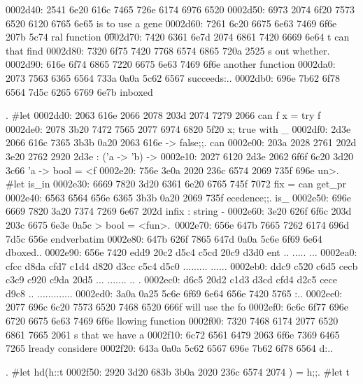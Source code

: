 \begin{bo
00010e0: 7865 647d 5c62 6567 696e 7b76 6572 6261  xed}
\begin{verba
00010f0: 7469 6d7d 0a20 2023 7479 7065 2074 6572  tim}
\begin{
0001c40: 7665 7262 6174 696d 7d0a 2020 236c 6574  verbatim}
\begin{boxe
00027a0: 647d 5c62 6567 696e 7b76 6572 6261 7469  d}
\begin{verbati
00027b0: 6d7d 0a20 2023 6c65 7420 696e 6669 7865  m}
\begin{v
0002c60: 6572 6261 7469 6d7d 0a20 2023 6c65 7420  erbatim}
0002d40: 2541 6e20 616c 7465 726e 6174 6976 6520  %
0002d50: 6973 2074 6f20 7573 6520 6120 6765 6e65  is to use a gene
0002d60: 7261 6c20 6675 6e63 7469 6f6e 207b 5c74  ral function {\t
0002d70: 7420 6361 6e7d 2074 6861 7420 6669 6e64  t can} that find
0002d80: 7320 6f75 7420 7768 6574 6865 720a 2525  s out whether.%
0002d90: 616e 6f74 6865 7220 6675 6e63 7469 6f6e  another function
0002da0: 2073 7563 6365 6564 733a 0a0a 5c62 6567   succeeds:..\beg
0002db0: 696e 7b62 6f78 6564 7d5c 6265 6769 6e7b  in{boxed}\begin{
0002dc0: 7665 7262 6174 696d 7d0a 2020 236c 6574  verbatim}.  #let
0002dd0: 2063 616e 2066 2078 203d 2074 7279 2066   can f x = try f
0002de0: 2078 3b20 7472 7565 2077 6974 6820 5f20   x; true with _ 
0002df0: 2d3e 2066 616c 7365 3b3b 0a20 2063 616e  -> false;;.  can
0002e00: 203a 2028 2761 202d 3e20 2762 2920 2d3e   : ('a -> 'b) ->
0002e10: 2027 6120 2d3e 2062 6f6f 6c20 3d20 3c66   'a -> bool = <f
0002e20: 756e 3e0a 2020 236c 6574 2069 735f 696e  un>.  #let is_in
0002e30: 6669 7820 3d20 6361 6e20 6765 745f 7072  fix = can get_pr
0002e40: 6563 6564 656e 6365 3b3b 0a20 2069 735f  ecedence;;.  is_
0002e50: 696e 6669 7820 3a20 7374 7269 6e67 202d  infix : string -
0002e60: 3e20 626f 6f6c 203d 203c 6675 6e3e 0a5c  > bool = <fun>.\
0002e70: 656e 647b 7665 7262 6174 696d 7d5c 656e  end{verbatim}\en
0002e80: 647b 626f 7865 647d 0a0a 5c6e 6f69 6e64  d{boxed}..\noind
0002e90: 656e 7420 edd9 20c2 d5c4 c5cd 20c9 d3d0  ent .. ..... ...
0002ea0: cfcc d8da cfd7 c1d4 d820 d3cc c5c4 d5c0  ......... ......
0002eb0: ddc9 c520 c6d5 cecb c3c9 c920 c9da 20d5  ... ....... .. .
0002ec0: d6c5 20d2 c1d3 d3cd cfd4 d2c5 cece d9c8  .. .............
0002ed0: 3a0a 0a25 5c6e 6f69 6e64 656e 7420 5765  :..%
0002ee0: 2077 696c 6c20 7573 6520 7468 6520 666f   will use the fo
0002ef0: 6c6c 6f77 696e 6720 6675 6e63 7469 6f6e  llowing function
0002f00: 7320 7468 6174 2077 6520 6861 7665 2061  s that we have a
0002f10: 6c72 6561 6479 2063 6f6e 7369 6465 7265  lready considere
0002f20: 643a 0a0a 5c62 6567 696e 7b62 6f78 6564  d:..\begin{boxed
0002f30: 7d5c 6265 6769 6e7b 7665 7262 6174 696d  }\begin{verbatim
0002f40: 7d0a 2020 236c 6574 2068 6428 683a 3a74  }.  #let hd(h::t
0002f50: 2920 3d20 683b 3b0a 2020 236c 6574 2074  ) = h;;.  #let t

\end{verbatim
0002f40: 7d0a 2020 236c 6574 2068 6428 683a 3a74  }
\end{boxed
0002f30: 7d5c 6265 6769 6e7b 7665 7262 6174 696d  }
\end{
0002dc0: 7665 7262 6174 696d 7d0a 2020 236c 6574  verbatim}
\end{v
0002c60: 6572 6261 7469 6d7d 0a20 2023 6c65 7420  erbatim}
\end{verbati
00027b0: 6d7d 0a20 2023 6c65 7420 696e 6669 7865  m}
\end{boxe
00027a0: 647d 5c62 6567 696e 7b76 6572 6261 7469  d}
\end{
0001c40: 7665 7262 6174 696d 7d0a 2020 236c 6574  verbatim}
\end{verba
00010f0: 7469 6d7d 0a20 2023 7479 7065 2074 6572  tim}
\end{bo
00010e0: 7865 647d 5c62 6567 696e 7b76 6572 6261  xed}
